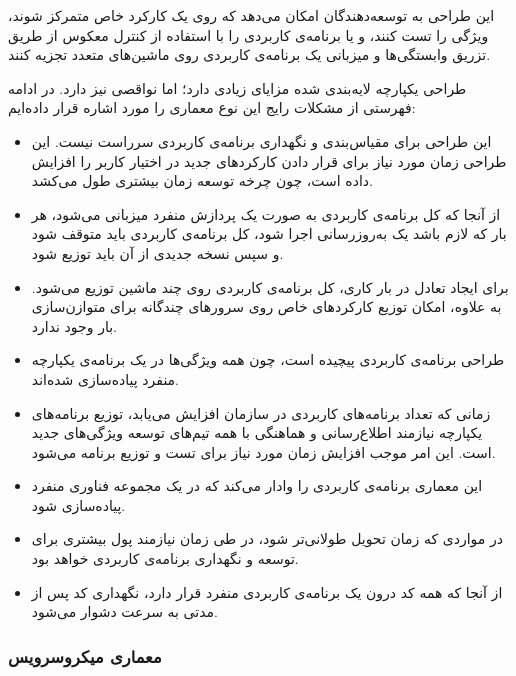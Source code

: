 این طراحی به توسعه‌دهندگان امکان می‌دهد که روی یک کارکرد خاص متمرکز شوند، ویژگی را تست کنند، و یا برنامه‌ی کاربردی را با استفاده از کنترل معکوس از طریق تزریق وابستگی‌ها و میزبانی یک برنامه‌ی کاربردی روی ماشین‌های متعدد تجزیه کنند.

طراحی یکپارچه لایه‌بندی شده مزایای زیادی دارد؛ اما نواقصی نیز دارد. در ادامه فهرستی از مشکلات رایج این نوع معماری را مورد اشاره قرار داده‌ایم:

\begin{itemize}
	
	\item این طراحی برای مقیاس‌بندی و نگهداری برنامه‌ی کاربردی سرراست نیست. این طراحی زمان مورد نیاز برای قرار دادن کارکردهای جدید در اختیار کاربر را افزایش داده است، چون چرخه توسعه زمان بیشتری طول می‌کشد.
	
	\item از آنجا که کل برنامه‌ی کاربردی به صورت یک پردازش منفرد میزبانی می‌شود، هر بار که لازم باشد یک به‌روزرسانی اجرا شود، کل برنامه‌ی کاربردی باید متوقف شود و سپس نسخه جدیدی از آن باید توزیع شود.
	
	\item برای ایجاد تعادل در بار کاری، کل برنامه‌ی کاربردی روی چند ماشین توزیع می‌شود. به علاوه، امکان توزیع کارکردهای خاص روی سرورهای چندگانه برای متوازن‌سازی بار وجود ندارد.
	
	\item طراحی برنامه‌ی کاربردی پیچیده است، چون همه ویژگی‌ها در یک برنامه‌ی یکپارچه منفرد پیاده‌سازی شده‌اند.
	
	\item زمانی که تعداد برنامه‌های کاربردی‌ در سازمان افزایش می‌یابد، توزیع برنامه‌های یکپارچه نیازمند اطلاع‌رسانی و هماهنگی با همه تیم‌های توسعه ویژگی‌های جدید است. این امر موجب افزایش زمان مورد نیاز برای تست و توزیع برنامه می‌شود.
	
	\item این معماری برنامه‌ی کاربردی را وادار می‌کند که در یک مجموعه فناوری منفرد پیاده‌سازی شود.
	
	\item در مواردی که زمان تحویل طولانی‌تر شود، در طی زمان نیازمند پول بیشتری برای توسعه و نگهداری برنامه‌ی کاربردی خواهد بود.
	
	\item از آنجا که همه کد درون یک برنامه‌ی کاربردی منفرد قرار دارد، نگهداری کد پس از مدتی به سرعت دشوار می‌شود.
	
\end{itemize}

\subsubsection{معماری میکروسرویس}

